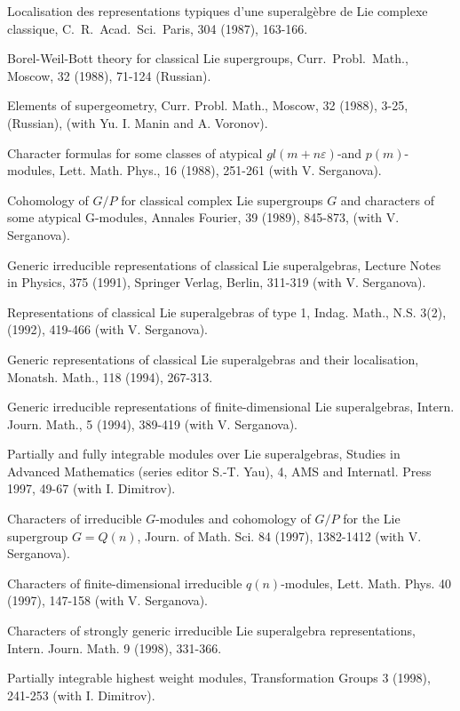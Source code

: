 \documentclass[11pt]{amsart}
\begin{document}
\myss \label{12.} Localisation des representations typiques d'une
superalg\`ebre de Lie complexe classique, C.~R.~Acad.~Sci.~Paris,
304 (1987), 163-166.

\myss \label{13.} Borel-Weil-Bott theory for classical Lie
supergroups, Curr.~Probl.~Math., Moscow, 32 (1988), 71-124
(Russian).

\myss \label{14.} Elements of supergeometry, Curr. Probl. Math.,
Moscow, 32 (1988), 3-25, (Russian), (with Yu. I. Manin and A.
Voronov).

\myss \label{15.} Character formulas for some classes of atypical
$gl(m+n\varepsilon)$-and $p(m)$-modules, Lett. Math. Phys., 16
(1988), 251-261 (with V. Serganova).

\myss \label{16.} Cohomology of $G/P$ for classical complex Lie
supergroups $G$ and characters of some atypical G-modules, Annales
Fourier, 39 (1989), 845-873, (with V. Serganova).

\myss \label{17.}  Generic irreducible representations of
classical Lie superalgebras, Lecture Notes in Physics, 375 (1991),
Springer Verlag, Berlin, 311-319 (with V. Serga\-nova).

\myss \label{18.}  Representations of classical Lie superalgebras
of type 1, Indag. Math., N.S. 3(2), (1992), 419-466 (with V.
Serganova).

\myss \label{19.}  Generic representations of classical Lie
superalgebras and their localisation, Monatsh. Math., 118 (1994),
267-313.

\myss \label{20.}  Generic irreducible representations of
finite-dimensional Lie superalgebras, Intern. Journ. Math., 5
(1994), 389-419 (with V. Serganova).

\myss \label{21.}  Partially and fully integrable modules over Lie
superalgebras, Studies in Advanced Mathematics (series editor
S.-T. Yau), 4, AMS and Internatl. Press 1997, 49-67 (with I.
Dimitrov).

\myss \label{22.}  Characters of irreducible $G$-modules and
cohomology of $G/P$ for the Lie supergroup $G=Q(n)$, Journ. of
Math. Sci. 84 (1997), 1382-1412 (with V. Serganova).

\myss \label{23.}  Characters of finite-dimensional irreducible
$q(n)$-modules, Lett. Math. Phys.  40 (1997), 147-158 (with V.
Serganova).

\myss \label{24.}  Characters of strongly generic irreducible Lie
superalgebra representations, Intern. Journ. Math. 9 (1998),
331-366.

\myss \label{25.}  Partially integrable highest weight modules,
Transformation Groups 3 (1998), 241-253 (with I. Dimitrov).
\end{document}

